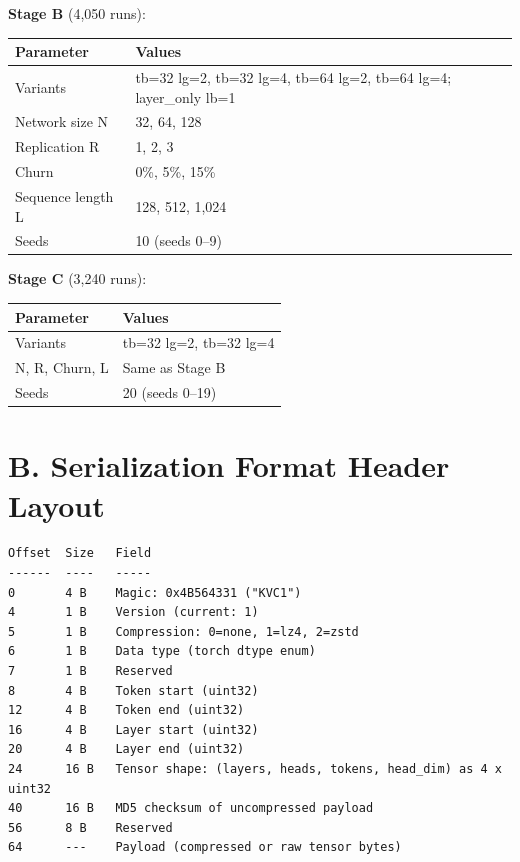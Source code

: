 \documentclass[11pt]{article}
\begin{document}
\textbf{Stage B} (4,050 runs):

\begin{longtable}[]{@{}ll@{}}
\toprule
Parameter & Values \\
\midrule
\endhead
\bottomrule
\endlastfoot
Variants & tb=32 lg=2, tb=32 lg=4, tb=64 lg=2, tb=64 lg=4; layer\_only lb=1 \\
Network size N & 32, 64, 128 \\
Replication R & 1, 2, 3 \\
Churn & 0\%, 5\%, 15\% \\
Sequence length L & 128, 512, 1,024 \\
Seeds & 10 (seeds 0--9) \\
\end{longtable}

\textbf{Stage C} (3,240 runs):

\begin{longtable}[]{@{}ll@{}}
\toprule
Parameter & Values \\
\midrule
\endhead
\bottomrule
\endlastfoot
Variants & tb=32 lg=2, tb=32 lg=4 \\
N, R, Churn, L & Same as Stage B \\
Seeds & 20 (seeds 0--19) \\
\end{longtable}

\section{B. Serialization Format Header Layout}

\begin{verbatim}
Offset  Size   Field
------  ----   -----
0       4 B    Magic: 0x4B564331 ("KVC1")
4       1 B    Version (current: 1)
5       1 B    Compression: 0=none, 1=lz4, 2=zstd
6       1 B    Data type (torch dtype enum)
7       1 B    Reserved
8       4 B    Token start (uint32)
12      4 B    Token end (uint32)
16      4 B    Layer start (uint32)
20      4 B    Layer end (uint32)
24      16 B   Tensor shape: (layers, heads, tokens, head_dim) as 4 x uint32
40      16 B   MD5 checksum of uncompressed payload
56      8 B    Reserved
64      ---    Payload (compressed or raw tensor bytes)
\end{verbatim}
\end{document}
